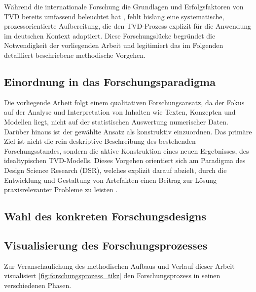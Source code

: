 Während die internationale Forschung die Grundlagen und Erfolgsfaktoren von TVD bereits umfassend beleuchtet hat \autocite{z.B. Ballard}, fehlt bislang eine systematische, prozessorientierte Aufbereitung, die den TVD-Prozess explizit für die Anwendung im deutschen Kontext adaptiert. Diese Forschungslücke begründet die Notwendigkeit der vorliegenden Arbeit und legitimiert das im Folgenden detailliert beschriebene methodische Vorgehen.

\subsection{Einordnung in das Forschungsparadigma}
\label{sec: 3.1.2}

Die vorliegende Arbeit folgt einem qualitativen Forschungsansatz, da der Fokus auf der Analyse und Interpretation von Inhalten wie Texten, Konzepten und Modellen liegt, nicht auf der statistischen Auswertung numerischer Daten. Darüber hinaus ist der gewählte Ansatz als konstruktiv einzuordnen. Das primäre Ziel ist nicht die rein deskriptive Beschreibung des bestehenden Forschungsstandes, sondern die aktive Konstruktion eines neuen Ergebnisses, des idealtypischen TVD-Modells. Dieses Vorgehen orientiert sich am Paradigma des Design Science Research (DSR), welches explizit darauf abzielt, durch die Entwicklung und Gestaltung von Artefakten einen Beitrag zur Lösung praxisrelevanter Probleme zu leisten \autocite[Vgl.][S.4]{benner-wickner_leitfaden_2020}.



\subsection{Wahl des konkreten Forschungsdesigns}
\label{sec: 3.1.3}


\subsection{Visualisierung des Forschungsprozesses}
\label{sec: 3.1.4}
Zur Veranschaulichung des methodischen Aufbaus und Verlauf dieser Arbeit visualisiert \cref{fig:forschungsprozess_tikz} den Forschungsprozess in seinen verschiedenen Phasen.


